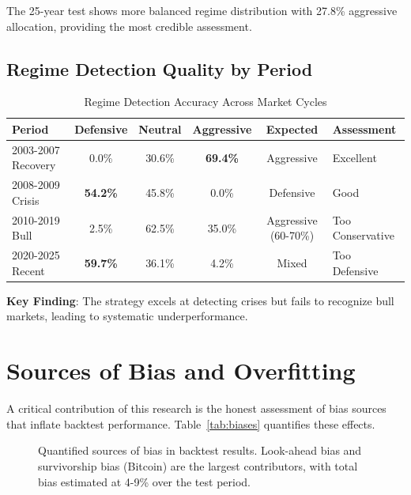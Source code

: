 \documentclass[twocolumn,ieee]{arithmaxresearch}
\begin{document}
The 25-year test shows more balanced regime distribution with 27.8\% aggressive allocation, providing the most credible assessment.

\subsection{Regime Detection Quality by Period}

\begin{table}[t]
\centering
\caption{Regime Detection Accuracy Across Market Cycles}
\label{tab:regime_quality}
\begin{tabular}{lccccl}
\toprule
\textbf{Period} & \textbf{Defensive} & \textbf{Neutral} & \textbf{Aggressive} & \textbf{Expected} & \textbf{Assessment} \\
\midrule
2003-2007 Recovery & 0.0\% & 30.6\% & \textbf{69.4\%} & Aggressive & Excellent \\
2008-2009 Crisis & \textbf{54.2\%} & 45.8\% & 0.0\% & Defensive & Good \\
2010-2019 Bull & 2.5\% & 62.5\% & 35.0\% & Aggressive (60-70\%) & Too Conservative \\
2020-2025 Recent & \textbf{59.7\%} & 36.1\% & 4.2\% & Mixed & Too Defensive \\
\bottomrule
\end{tabular}
\end{table}

\textbf{Key Finding}: The strategy excels at detecting crises but fails to recognize bull markets, leading to systematic underperformance.

\section{Sources of Bias and Overfitting}

A critical contribution of this research is the honest assessment of bias sources that inflate backtest performance. Table~\ref{tab:biases} quantifies these effects.

\begin{figure}[t]
\centering
{}
\caption{Quantified sources of bias in backtest results. Look-ahead bias and survivorship bias (Bitcoin) are the largest contributors, with total bias estimated at 4-9\% over the test period.}
\label{fig:bias_sources}
\end{figure}
\end{document}

